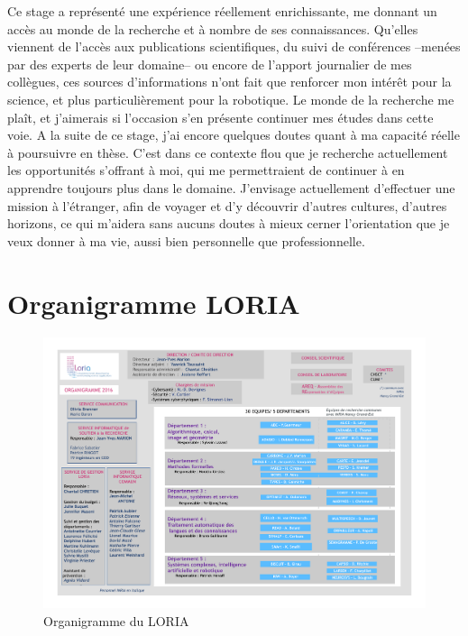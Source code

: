 \documentclass{tnreport}
\begin{document}
Ce stage a représenté une expérience réellement enrichissante, me donnant un accès au monde de la recherche et à nombre de ses connaissances. Qu'elles viennent de l'accès aux publications scientifiques, du suivi de conférences --menées par des experts de leur domaine-- ou encore de l'apport journalier de mes collègues, ces sources d'informations n'ont fait que renforcer mon intérêt pour la science, et plus particulièrement pour la robotique.
\newpage
Le monde de la recherche me plaît, et j'aimerais si l'occasion s'en présente continuer mes études dans cette voie. A la suite de ce stage, j'ai encore quelques doutes quant à ma capacité réelle à poursuivre en thèse. C'est dans ce contexte flou que je recherche actuellement les opportunités s'offrant à moi, qui me permettraient de continuer à en apprendre toujours plus dans le domaine. J'envisage actuellement d'effectuer une mission à l'étranger, afin de voyager et d'y découvrir d'autres cultures, d'autres horizons, ce qui m'aidera sans aucuns doutes à mieux cerner l'orientation que je veux donner à ma vie, aussi bien personnelle que professionnelle. 

 
\cleardoublepage
\renewcommand{\tocbibname}{Bibliographie / Webographie}
\nocite{*}



\cleardoublepage

\printglossary
\printglossaries
\cleardoublepage

\listoffigures
\cleardoublepage

\lstlistoflistings
\cleardoublepage

\appendix
\chapter{Organigramme LORIA}

\begin{figure}[h]
    \centering
    \includegraphics[scale=0.6,angle=90]{figures/orga-loria}
    \caption{Organigramme du LORIA}
    \label{fig:orgaLoria}
\end{figure}
\clearpage
\end{document}
